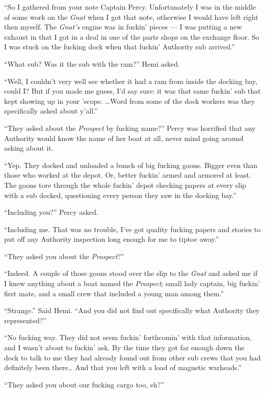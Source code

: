 \documentclass[
]{scrbook}
\begin{document}
``So I gathered from your note Captain Percy. Unfortunately I was in the
middle of some work on the \emph{Gnat} when I got that note, otherwise I
would have left right then myself. The \emph{Gnat's} engine was in
fuckin' pieces --- I was putting a new exhaust in that I got in a deal
in one of the parts shops on the exchange floor. So I was stuck on the
fucking dock when that fuckin' Authority sub arrived.''

``What sub? Was it the sub with the ram?'' Hemi asked.

``Well, I couldn't very well see whether it had a ram from inside the
docking bay, could I? But if you made me guess, I'd say sure: it was
that same fuckin' sub that kept showing up in your 'scope. \ldots Word
from some of the dock workers was they specifically asked about y'all.''

``They asked about the \emph{Prospect} by fucking name?'' Percy was
horrified that any Authority would know the name of her boat at all,
never mind going around asking about it.

``Yep. They docked and unloaded a bunch of big fucking goons. Bigger
even than those who worked at the depot. Or, better fuckin' armed and
armored at least. The goons tore through the whole fuckin' depot
checking papers at every slip with a sub docked, questioning every
person they saw in the docking bay.''

``Including you?'' Percy asked.

``Including me. That was no trouble, I've got quality fucking papers and
stories to put off any Authority inspection long enough for me to tiptoe
away.''

``They asked you about the \emph{Prospect}?''

``Indeed. A couple of those goons stood over the slip to the \emph{Gnat}
and asked me if I knew anything about a boat named the \emph{Prospect};
small lady captain, big fuckin' first mate, and a small crew that
included a young man among them.''

``Strange.'' Said Hemi. ``And you did not find out specifically what
Authority they represented?''

``No fucking way. They did not seem fuckin' forthcomin' with that
information, and I wasn't about to fuckin' ask. By the time they got far
enough down the dock to talk to me they had already found out from other
sub crews that you had definitely been there\ldots{} And that you left
with a load of magnetic warheads.''

``They asked you about our fucking cargo too, eh?''
\end{document}
